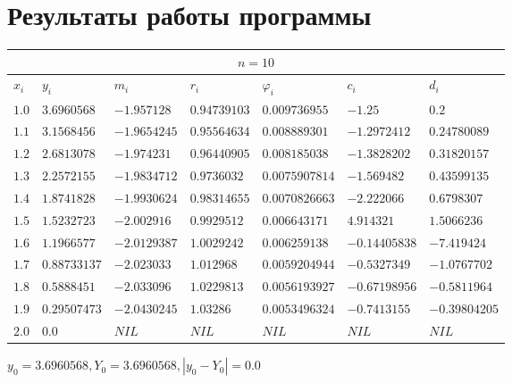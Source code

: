 \section{Результаты работы программы}
\begin{table}[h!]
	\begin{tabular}{|p{3ex}|l|l|l|l|l|l|}
		\hline
		\multicolumn{7}{|c|}{$n = 10$}                                                                                   \\
		\hline
		$x_i$  & $y_i$          & $m_i$          & $r_i$          & $\varphi_i$      & $c_i$           & $d_i$           \\
		\hline
		$1.0 $ & $ 3.6960568  $ & $ -1.957128  $ & $ 0.94739103 $ & $ 0.009736955  $ & $ -1.25       $ & $ 0.2         $ \\
		$1.1 $ & $ 3.1568456  $ & $ -1.9654245 $ & $ 0.95564634 $ & $ 0.008889301  $ & $ -1.2972412  $ & $ 0.24780089  $ \\
		$1.2 $ & $ 2.6813078  $ & $ -1.974231  $ & $ 0.96440905 $ & $ 0.008185038  $ & $ -1.3828202  $ & $ 0.31820157  $ \\
		$1.3 $ & $ 2.2572155  $ & $ -1.9834712 $ & $ 0.9736032  $ & $ 0.0075907814 $ & $ -1.569482   $ & $ 0.43599135  $ \\
		$1.4 $ & $ 1.8741828  $ & $ -1.9930624 $ & $ 0.98314655 $ & $ 0.0070826663 $ & $ -2.222066   $ & $ 0.6798307   $ \\
		$1.5 $ & $ 1.5232723  $ & $ -2.002916  $ & $ 0.9929512  $ & $ 0.006643171  $ & $ 4.914321    $ & $ 1.5066236   $ \\
		$1.6 $ & $ 1.1966577  $ & $ -2.0129387 $ & $ 1.0029242  $ & $ 0.006259138  $ & $ -0.14405838 $ & $ -7.419424   $ \\
		$1.7 $ & $ 0.88733137 $ & $ -2.023033  $ & $ 1.012968   $ & $ 0.0059204944 $ & $ -0.5327349  $ & $ -1.0767702  $ \\
		$1.8 $ & $ 0.5888451  $ & $ -2.033096  $ & $ 1.0229813  $ & $ 0.0056193927 $ & $ -0.67198956 $ & $ -0.5811964  $ \\
		$1.9 $ & $ 0.29507473 $ & $ -2.0430245 $ & $ 1.03286    $ & $ 0.0053496324 $ & $ -0.7413155  $ & $ -0.39804205 $ \\
		$2.0 $ & $ 0.0        $ & $ NIL        $ & $ NIL        $ & $ NIL          $ & $ NIL         $ & $ NIL         $ \\
		\hline
	\end{tabular}
\end{table}

$y_0 = 3.6960568, Y_0 = 3.6960568, |y_0 - Y_0| = 0.0$

